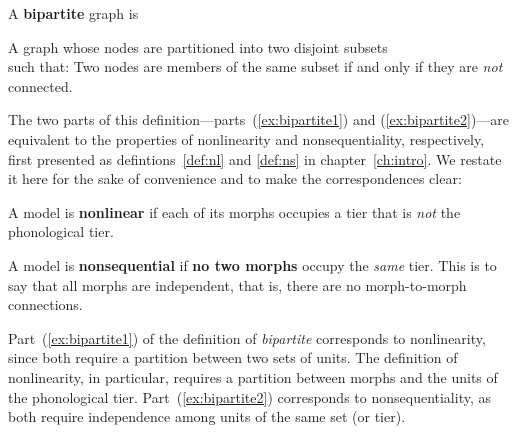 \begin{exe} 
	\ex \label{ex:bipartite} A \textbf{bipartite} graph is 
	\begin{xlist} 
		\ex \label{ex:bipartite1} %
	 	A graph whose nodes are partitioned into two disjoint subsets \\ such that: %
		\ex \label{ex:bipartite2} %
		Two nodes are members of the same subset if and only if 
		they are \emph{not} connected.
	\end{xlist}
\end{exe}
The two parts of this definition---parts~(\ref{ex:bipartite1}) and (\ref{ex:bipartite2})---are equivalent to the properties of nonlinearity and 
nonsequentiality, respectively, first presented as defintions~\ref{def:nl} and \ref{def:ns} in chapter~\ref{ch:intro}. We restate it here for the sake of convenience and to make the correspondences clear:
	\medskip
	\begin{description}[noitemsep]
	\item[Nonlinearity:]
	A model is \textbf{nonlinear} if each of its morphs occupies a tier that is \emph{not} the phonological tier.
	\item[Nonsequentiality:]
	A model is \textbf{nonsequential} if \textbf{no two morphs} occupy the \emph{same} tier. This is to say that all morphs are independent, that is, there are no morph-to-morph connections.
	\end{description}
	\medskip
Part~(\ref{ex:bipartite1}) of the definition of \emph{bipartite} corresponds to nonlinearity, since both require a partition between two sets of units. The definition of nonlinearity, in particular, requires a partition between morphs and the units of the phonological tier. 
Part~(\ref{ex:bipartite2}) corresponds to nonsequentiality, as both require independence among units of the same set (or tier).

